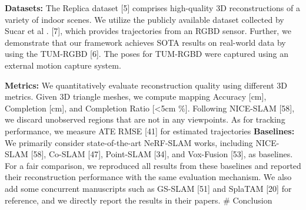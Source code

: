 \documentclass[twocolumn]{article} %
\begin{document}
\begin{table}[htbp]
\centering
{}
\caption{TUM[6] (ATE RMSE ↓[cm])}
\label{table:}
\end{table}

\textbf{Datasets:} The Replica dataset {[}5{]} comprises high-quality 3D
reconstructions of a variety of indoor scenes. We utilize the publicly
available dataset collected by Sucar et al . {[}7{]}, which provides
trajectories from an RGBD sensor. Further, we demonstrate that our
framework achieves SOTA results on real-world data by using the TUM-RGBD
{[}6{]}. The poses for TUM-RGBD were captured using an external motion
capture system.

\textbf{Metrics:} We quantitatively evaluate reconstruction quality
using different 3D metrics. Given 3D triangle meshes, we compute mapping
Accuracy {[}cm{]}, Completion {[}cm{]}, and Completion Ratio
{[}\textless5cm \%{]}. Following NICE-SLAM {[}58{]}, we discard
unobserved regions that are not in any viewpoints. As for tracking
performance, we measure ATE RMSE {[}41{]} for estimated trajectories
\textbf{Baselines:} We primarily consider state-of-the-art NeRF-SLAM
works, including NICE-SLAM {[}58{]}, Co-SLAM {[}47{]}, Point-SLAM
{[}34{]}, and Vox-Fusion {[}53{]}, as baselines. For a fair comparison,
we reproduced all results from these baselines and reported their
reconstruction performance with the same evaluation mechanism. We also
add some concurrent manuscripts such as GS-SLAM {[}51{]} and SplaTAM
{[}20{]} for reference, and we directly report the results in their
papers. \# Conclusion
\end{document}

